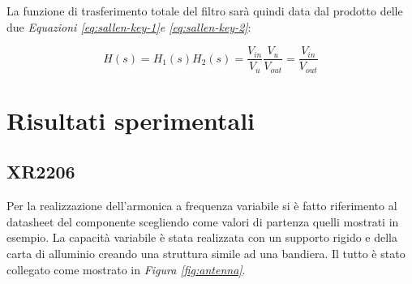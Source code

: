\documentclass[titlepage]{report}
\begin{document}
	La funzione di trasferimento totale del filtro sarà quindi data dal prodotto delle due \textit{Equazioni \ref{eq:sallen-key-1}e \ref{eq:sallen-key-2}}:

	\begin{equation}
		H(s) = H_1(s)H_2(s) =  \frac{V_{in}}{V_u}\frac{V_u}{V_{out}} = \frac{V_{in}}{V_{out}}
	\end{equation}

	
\chapter{Risultati sperimentali}
\label{ch:Risultati_sperimentali}
\section{XR2206}
	Per la realizzazione dell'armonica a frequenza variabile si è fatto riferimento al datasheet del componente scegliendo come valori di partenza quelli mostrati in esempio. 
	La capacità variabile è stata realizzata con un supporto rigido e della carta di alluminio creando una struttura simile ad una bandiera. Il tutto è stato collegato come mostrato in \textit{Figura \ref{fig:antenna}}.
\end{document}
